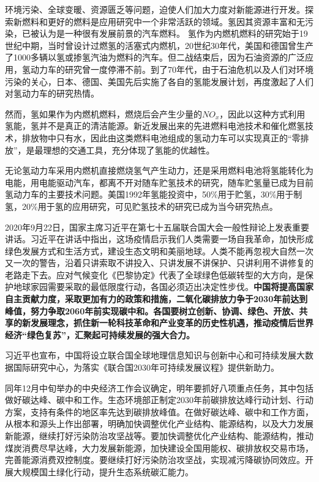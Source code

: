 \documentclass[UTF8,a4paper]{ctexart}
\begin{document}
	环境污染、全球变暖、资源匮乏等问题，迫使人们加大力度对新能源进行开发。探索新燃料和更好的燃料是应用研究中一个非常活跃的领域。氢因其资源丰富和无污染，已被认为是一种很有发展前景的汽车燃料。
	氢作为内燃机燃料的研究始于19 世纪中期，当时曾设计过燃氢的活塞式内燃机，20世纪30年代，美国和德国曾生产了1000多辆以氢或掺氢汽油为燃料的汽车。但二战结束后，因为石油资源的广泛应用，氢动力车的研究曾一度停滞不前。到了70年代，由于石油危机以及人们对环境污染的关心，日本、德国、美国先后实施了各自的氢能发展计划，再度激起了人们对氢动力车的研究热情。
	
	然而，氢如果作为内燃机燃料，燃烧后会产生少量的$NO_{x}$，因此以这种方式利用氢能，氢并不是真正的清洁能源。新近发展出来的先进燃料电池技术和催化燃氢技术，排放物中只有水，因此由这类燃料电池组成的氢动力车可以实现真正的“零排放”，是最理想的交通工具，充分体现了氢能的优越性。
	
	无论氢动力车采用内燃机直接燃烧氢气产生动力，还是采用燃料电池将氢能转化为电能，用电能驱动汽车，都离不开对随车贮氢技术的研究，随车贮氢量已成为目前氢动力车的主要技术问题。美国1992年氢能投资中，50\%用于贮氢，30\%用于制氢，20\%用于氢的应用研究，可见贮氢技术的研究已成为当今研究热点。
	
	2020年9月22日，国家主席习近平在第七十五届联合国大会一般性辩论上发表重要讲话。习近平在讲话中指出，这场疫情启示我们人类需要一场自我革命，加快形成绿色发展方式和生活方式，建设生态文明和美丽地球。人类不能再忽视大自然一次又一次的警告，沿着只讲索取不讲投入、只讲发展不讲保护、只讲利用不讲修复的老路走下去。应对气候变化《巴黎协定》代表了全球绿色低碳转型的大方向，是保护地球家园需要采取的最低限度行动，各国必须迈出决定性步伐。\textbf{中国将提高国家自主贡献力度，采取更加有力的政策和措施，二氧化碳排放力争于2030年前达到峰值，努力争取2060年前实现碳中和。各国要树立创新、协调、绿色、开放、共享的新发展理念，抓住新一轮科技革命和产业变革的历史性机遇，推动疫情后世界经济“绿色复苏”，汇聚起可持续发展的强大合力。}
	
	习近平也宣布，中国将设立联合国全球地理信息知识与创新中心和可持续发展大数据国际研究中心，为落实《联合国2030年可持续发展议程》提供新助力。
	
	同年12月中旬举办的中央经济工作会议确定，明年要抓好八项重点任务，其中包括做好碳达峰、碳中和工作。生态环境部正制定2030年前碳排放达峰行动计划、行动方案，支持有条件的地区率先达到碳排放峰值。在做好碳达峰、碳中和工作方面，从根本和源头上作出部署，明确加快调整优化产业结构、能源结构，以及大力发展新能源，继续打好污染防治攻坚战等。要加快调整优化产业结构、能源结构，推动煤炭消费尽早达峰，大力发展新能源，加快建设全国用能权、碳排放权交易市场，完善能源消费双控制度。要继续打好污染防治攻坚战，实现减污降碳协同效应。开展大规模国土绿化行动，提升生态系统碳汇能力。
	
\end{document}
